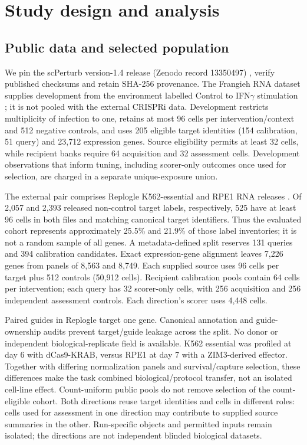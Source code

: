 \section{Study design and analysis}
\label{sec:experiments}
\subsection{Public data and selected population}
We pin the scPerturb version-1.4 release (Zenodo record 13350497) \citep{scperturbdata,scperturb2024}, verify published checksums and retain SHA-256 provenance. The Frangieh RNA dataset supplies development from the environment labelled Control to IFN$\gamma$ stimulation \citep{frangieh2021}; it is not pooled with the external CRISPRi data. Development restricts multiplicity of infection to one, retains at most 96 cells per intervention/context and 512 negative controls, and uses 205 eligible target identities (154 calibration, 51 query) and 23,712 expression genes. Source eligibility permits at least 32 cells, while recipient banks require 64 acquisition and 32 assessment cells. Development observations that inform tuning, including scorer-only outcomes once used for selection, are charged in a separate unique-exposure union.

The external pair comprises Replogle K562-essential and RPE1 RNA releases \citep{replogle2022}. Of 2,057 and 2,393 released non-control target labels, respectively, 525 have at least 96 cells in both files and matching canonical target identifiers. Thus the evaluated cohort represents approximately 25.5\% and 21.9\% of those label inventories; it is not a random sample of all genes. A metadata-defined split reserves 131 queries and 394 calibration candidates. Exact expression-gene alignment leaves 7,226 genes from panels of 8,563 and 8,749. Each supplied source uses 96 cells per target plus 512 controls (50,912 cells). Recipient calibration pools contain 64 cells per intervention; each query has 32 scorer-only cells, with 256 acquisition and 256 independent assessment controls. Each direction's scorer uses 4,448 cells.

Paired guides in Replogle target one gene. Canonical annotation and guide-ownership audits prevent target/guide leakage across the split. No donor or independent biological-replicate field is available. K562 essential was profiled at day 6 with dCas9-KRAB, versus RPE1 at day 7 with a ZIM3-derived effector. Together with differing normalization panels and survival/capture selection, these differences make the task combined biological/protocol transfer, not an isolated cell-line effect. Count-uniform public pools do not remove selection of the count-eligible cohort. Both directions reuse target identities and cells in different roles: cells used for assessment in one direction may contribute to supplied source summaries in the other. Run-specific objects and permitted inputs remain isolated; the directions are not independent blinded biological datasets.

